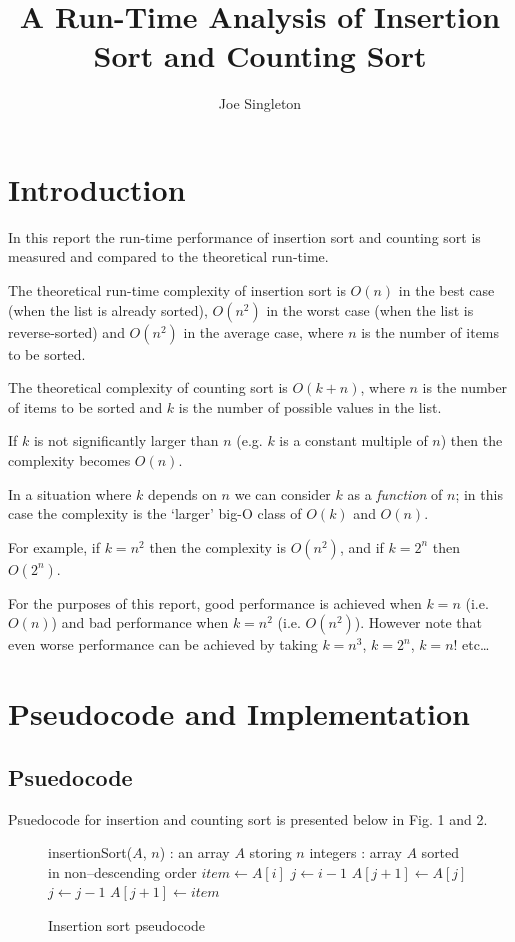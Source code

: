 \documentclass{article}
\title{A Run-Time Analysis of Insertion Sort and Counting Sort}
\author{Joe Singleton}
\date{}
\begin{document}
\maketitle

\section{Introduction}

In this report the run-time performance of insertion sort and counting sort is measured and compared to the theoretical run-time.

The theoretical run-time complexity of insertion sort is $O(n)$ in the best case (when the list is already sorted), $O(n^2)$ in the worst case (when the list is reverse-sorted) and $O(n^2)$ in the average case, where $n$ is the number of items to be sorted.

The theoretical complexity of counting sort is $O(k+n)$, where $n$ is the number of items to be sorted and $k$ is the number of possible values in the list.

If $k$ is not significantly larger than $n$ (e.g. $k$ is a constant multiple of $n$) then the complexity becomes $O(n)$.

In a situation where $k$ depends on $n$ we can consider $k$ as a \textit{function} of $n$; in this case the complexity is the `larger' big-O class of $O(k)$ and $O(n)$.

For example, if $k=n^2$ then the complexity is $O(n^2)$, and if $k=2^n$ then $O(2^n)$.

For the purposes of this report, good performance is achieved when $k=n$ (i.e. $O(n)$) and bad performance when $k=n^2$ (i.e. $O(n^2)$). However note that even worse performance can be achieved by taking $k=n^3$, $k=2^n$, $k=n!$ etc\ldots

\section{Pseudocode and Implementation}

\subsection{Psuedocode}
Psuedocode for insertion and counting sort is presented below in Fig. 1 and 2.

\begin{figure}[H]
\begin{algorithmic}
 insertionSort($A$, $n$)
: an array $A$ storing $n$ integers
: array $A$ sorted in non--descending order
  \STATE $item \leftarrow A[i]$
  \STATE $j \leftarrow i-1$
    \STATE $A[j+1] \leftarrow A[j]$
    \STATE $j \leftarrow j-1$
  \ENDWHILE
  \STATE $A[j+1] \leftarrow item$
\ENDFOR
\end{algorithmic}
\caption{Insertion sort pseudocode}
\end{figure}
\end{document}
